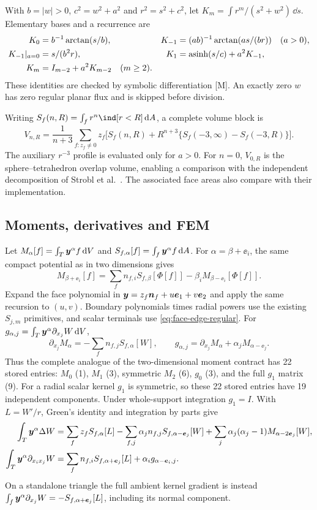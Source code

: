 With $b=|w|>0$, $c^2=w^2+a^2$ and $r^2=s^2+c^2$, let
$K_m=\int r^m/(s^2+w^2)\,\dd s$. Elementary bases and a recurrence are
\begin{align*}
 K_0&=b^{-1}\arctan(s/b),&
 K_{-1}&=(ab)^{-1}\arctan(as/(br))\quad(a>0),\\
 K_{-1}|_{a=0}&=s/(b^2r),&
 K_1&=\operatorname{asinh}(s/c)+a^2K_{-1},\\
 K_m&=I_{m-2}+a^2K_{m-2}\quad(m\ge2).
\end{align*}
These identities are checked by symbolic differentiation [M]. An exactly
zero $w$ has zero regular planar flux and is skipped before division.

Writing $S_f(n,R)=\int_f r^n\ind[r<R]\,\dd A$, a complete volume block is
\[
 V_{n,R}=\frac1{n+3}\sum_{f:z_f\ne0}z_f\bigl[S_f(n,R)
 +R^{n+3}\{S_f(-3,\infty)-S_f(-3,R)\}\bigr].
\]
The auxiliary $r^{-3}$ profile is evaluated only for $a>0$.
For $n=0$, $V_{0,R}$ is the sphere--tetrahedron overlap volume, enabling a
comparison with the independent decomposition of Strobl et al.~\cite{strobl2016}.
The associated face areas also compare with their implementation.

\subsection{Moments, derivatives and FEM}
Let $M_\alpha[f]=\int_T\bm y^\alpha f\,\mathrm{d} V$ and
$S_{f,\alpha}[f]=\int_f\bm y^\alpha f\,\mathrm{d} A$.
For $\alpha=\beta+\ee_i$, the same compact potential as in two dimensions gives
\[
 M_{\beta+\ee_i}[f]=\sum_f n_{f,i}S_{f,\beta}[\Phi[f]]
                  -\beta_i M_{\beta-\ee_i}[\Phi[f]].
\]
Expand the face polynomial in $\bm y=z_f\bm n_f+u\bm e_1+v\bm e_2$ and apply the same
recursion to $(u,v)$. Boundary polynomials times radial powers use the existing
$S_{j,m}$ primitives, and scalar terminals use \cref{eq:face-edge-regular}.
For $g_{\alpha,j}=\int_T\bm y^\alpha\partial_{x_j}W\,\mathrm{d} V$,
\[
 \partial_{x_j}M_\alpha=-\sum_f n_{f,j}S_{f,\alpha}[W],\qquad
 g_{\alpha,j}=\partial_{x_j}M_\alpha+\alpha_jM_{\alpha-\ee_j}.
\]
Thus the complete analogue of the two-dimensional moment contract has 22
stored entries: $M_0$ (1), $M_1$ (3), symmetric $M_2$ (6), $g_0$ (3),
and the full $g_1$ matrix (9). For a radial scalar kernel $g_1$ is symmetric,
so these 22 stored entries have 19 independent components. Under whole-support
integration $g_1=I$.
With $L=W'/r$, Green's identity and integration by parts give
\begin{align*}
 \int_T\bm y^\alpha\Delta W
 &=\sum_fz_f S_{f,\alpha}[L]
 -\sum_{f,j}\alpha_j n_{f,j}S_{f,\alpha-\bm e_j}[W]
 +\sum_j\alpha_j(\alpha_j-1)M_{\alpha-2\bm e_j}[W],\\
 \int_T\bm y^\alpha\partial_{x_i x_j}W
 &=\sum_fn_{f,i}S_{f,\alpha+\bm e_j}[L]+\alpha_i g_{\alpha-\bm e_i,j}.
\end{align*}
On a standalone triangle the full ambient kernel gradient is instead
$\int_f\bm y^\alpha\partial_{x_j}W=-S_{f,\alpha+\bm e_j}[L]$, including its
normal component.

